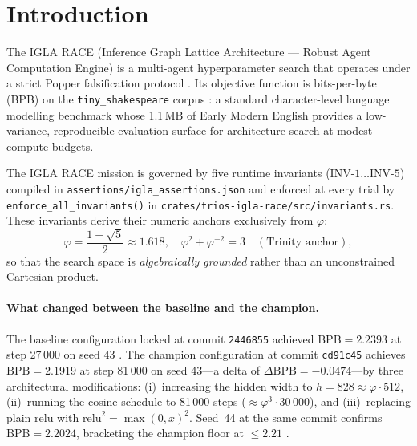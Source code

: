 \section{Introduction}
\label{sec:ch24-intro}

The IGLA RACE (Inference Graph Lattice Architecture --- Robust Agent
Computation Engine) is a multi-agent hyperparameter search that operates under a
strict Popper falsification protocol \cite{popper_logic_discovery}.  Its
objective function is bits-per-byte (BPB) on the \texttt{tiny\_shakespeare}
corpus \cite{karpathy_tinyshakespeare}: a standard character-level language
modelling benchmark whose 1.1\,MB of Early Modern English provides a
low-variance, reproducible evaluation surface for architecture search at modest
compute budgets.

The IGLA RACE mission is governed by five runtime invariants
($\mathrm{INV}\text{-}1\ldots\mathrm{INV}\text{-}5$) compiled in
\texttt{assertions/igla\_assertions.json} \cite{trios_igla_assertions} and
enforced at every trial by \texttt{enforce\_all\_invariants()} in
\texttt{crates/trios-igla-race/src/invariants.rs}.  These invariants derive
their numeric anchors exclusively from $\varphi$:
\begin{equation}\label{eq:ch24-trinity}
  \varphi = \frac{1+\sqrt{5}}{2} \approx 1.618,\quad
  \varphi^2 + \varphi^{-2} = 3 \quad (\text{Trinity anchor}),
\end{equation}
so that the search space is \emph{algebraically grounded} rather than an
unconstrained Cartesian product.

\paragraph{What changed between the baseline and the champion.}
The baseline configuration locked at commit \texttt{2446855} achieved
$\mathrm{BPB} = 2.2393$ at step 27\,000 on seed 43 \cite{trios_hive_honey}.
The champion configuration at commit \texttt{cd91c45} achieves
$\mathrm{BPB} = 2.1919$ at step 81\,000 on seed 43---a delta of
$\Delta\mathrm{BPB} = -0.0474$---by three architectural modifications:
(i)~increasing the hidden width to $h = 828 \approx \varphi \cdot 512$,
(ii)~running the cosine schedule to 81\,000 steps
($\approx \varphi^3 \cdot 30\,000$), and
(iii)~replacing plain $\mathrm{relu}$ with $\mathrm{relu}^2 = \max(0, x)^2$.
Seed~44 at the same commit confirms $\mathrm{BPB} = 2.2024$, bracketing the
champion floor at $\leq 2.21$ \cite{trios_issue_143}.

